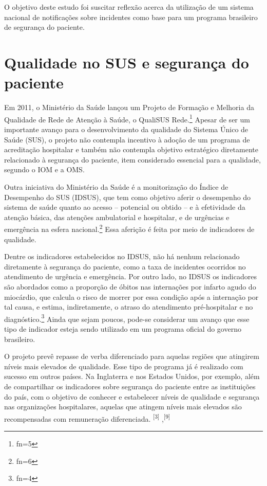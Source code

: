 \documentclass{article}
\makeatletter
\newcommand{\fn}{\afterassignment\fn@aux\count0=}
\newcommand{\fn@aux}{\csname fn\the\count0\endcsname}
\makeatother
\begin{document}
O objetivo deste estudo foi suscitar reflexão acerca da utilização de um sistema
nacional
de notificações sobre incidentes como base para um programa brasileiro de
segurança do
paciente.

\section{Qualidade no SUS e segurança do paciente}

Em 2011, o Ministério da Saúde lançou um Projeto de Formação e Melhoria da
Qualidade de
Rede de Atenção à Saúde, o QualiSUS Rede.\footnote{\fn5}
Apesar de ser um importante avanço para o desenvolvimento da qualidade do
Sistema
Único de Saúde (SUS), o projeto não contempla incentivo à adoção de um programa
de
acreditação hospitalar e também não contempla objetivo estratégico diretamente
relacionado à
segurança do paciente, item considerado essencial para a qualidade, segundo o
IOM e a
OMS.

Outra iniciativa do Ministério da Saúde é a monitorização do Índice de
Desempenho do SUS
(IDSUS), que tem como objetivo aferir o desempenho do sistema de saúde quanto ao
acesso –
potencial ou obtido – e à efetividade da atenção básica, das atenções
ambulatorial e
hospitalar, e de urgências e emergência na esfera nacional.\footnote{\fn6}
Essa aferição é feita por meio de indicadores de qualidade.

Dentre os indicadores estabelecidos no IDSUS, não há nenhum relacionado
diretamente à
segurança do paciente, como a taxa de incidentes ocorridos no atendimento de
urgência e
emergência. Por outro lado, no IDSUS os indicadores são abordados como a
proporção de óbitos
nas internações por infarto agudo do miocárdio, que calcula o risco de morrer
por essa
condição após a internação por tal causa, e estima, indiretamente, o atraso do
atendimento
pré-hospitalar e no diagnóstico.\footnote{\fn4}
Ainda que sejam poucos, pode-se considerar um avanço que esse tipo de indicador
esteja sendo utilizado em um programa oficial do governo brasileiro.

O projeto prevê repasse de verba diferenciado para aquelas regiões que atingirem
níveis
mais elevados de qualidade. Esse tipo de programa já é realizado com sucesso em
outros
países. Na Inglaterra e nos Estados Unidos, por exemplo, além de compartilhar os
indicadores
sobre segurança do paciente entre as instituições do país, com o objetivo de
conhecer e
estabelecer níveis de qualidade e segurança nas organizações hospitalares,
aquelas que
atingem níveis mais elevados são recompensadas com remuneração diferenciada.
\textsuperscript{[3]}
,\textsuperscript{[9]}
\end{document}
